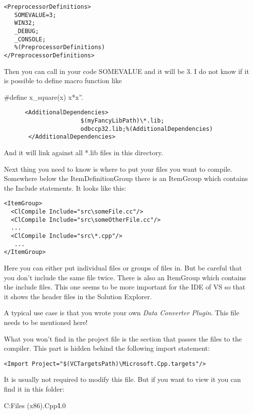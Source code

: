 \lstset{language=XML}
\begin{lstlisting}
<PreprocessorDefinitions>
   SOMEVALUE=3;
   WIN32;
   _DEBUG;
   _CONSOLE;
   %(PreprocessorDefinitions)
</PreprocessorDefinitions>
\end{lstlisting}

Then you can call in your code SOMEVALUE and it will be 3. I do not know if it
 is possible to define macro function like
\begin{listing}  
  #define x_square(x) x*x”. 
\end{listing}
\lstset{language=XML}
\begin{lstlisting}
      <AdditionalDependencies>
                      $(myFancyLibPath)\*.lib; 
                      odbccp32.lib;%(AdditionalDependencies)
       </AdditionalDependencies>
\end{lstlisting}

And it will link against all *.lib files in this directory. 

Next thing you need to know is where to put your files you want to compile. Somewhere below the ItemDefinitionGroup there is an ItemGroup which contains the Include statements. It looks like this:
\lstset{language=XML}
\begin{lstlisting}
<ItemGroup>
  <ClCompile Include="src\someFile.cc"/>
  <ClCompile Include="src\someOtherFile.cc"/>
  ...
  <ClCompile Include="src\*.cpp"/>
   ...
</ItemGroup>
\end{lstlisting}


Here you can either put individual files or groups of files in. But be careful that you don't include the same file twice. There is also an ItemGroup which contains the include files. This one seems to be more important for the IDE of VS so that it shows the header files in the Solution Explorer. 

A typical use case is that you wrote your own \emph{Data Converter Plugin}. This file needs to be mentioned here!

What you won't find in the project file is the section that passes the files to the compiler. This part is hidden behind the following import statement:
\lstset{language=XML}
\begin{lstlisting}
<Import Project="$(VCTargetsPath)\Microsoft.Cpp.targets"/>
\end{lstlisting}

It is usually not required to modify this file. But if you want to view it you can find it in this folder:
\begin{listing}

C:\Program Files (x86)\MSBuild\Microsoft.Cpp\v4.0\
\end{listing}

